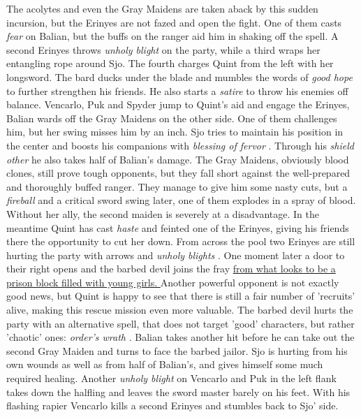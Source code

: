The acolytes and even the Gray Maidens are taken aback by this sudden incursion, but the Erinyes are not fazed and open the fight. One of them casts {\itshape fear} on Balian, but the buffs on the ranger aid him in shaking off the spell. A second Erinyes throws  {\itshape unholy blight} on the party, while a third wraps her entangling rope around Sjo. The fourth charges Quint from the left with her longsword. The bard ducks under the blade and mumbles the words of  {\itshape good hope} to further strengthen his friends. He also starts a  {\itshape satire} to throw his enemies off balance. Vencarlo, Puk and Spyder jump to Quint's aid and engage the Erinyes, Balian wards off the Gray Maidens on the other side. One of them challenges him, but her swing misses him by an inch. Sjo tries to maintain his position in the center and boosts his companions with  {\itshape blessing of fervor} . Through his  {\itshape shield other} he also takes half of Balian's damage. The Gray Maidens, obviously blood clones, still prove tough opponents, but they fall short against the well-prepared and thoroughly buffed ranger. They manage to give him some nasty cuts, but a  {\itshape fireball} and a critical sword swing later, one of them explodes in a spray of blood. Without her ally, the second maiden is severely at a disadvantage. In the meantime Quint has cast {\itshape haste} and feinted one of the Erinyes, giving his friends there the opportunity to cut her down. From across the pool two Erinyes are still hurting the party with arrows and  {\itshape unholy blights} . One moment later a door to their right opens and the barbed devil joins the fray \hyperref[fig:Gray-Maiden-recruits-of-sacrifices-616081293]{ from what looks to be a prison block filled with young girls. } Another powerful opponent is not exactly good news, but Quint is happy to see that there is still a fair number of 'recruits' alive, making this rescue mission even more valuable. The barbed devil hurts the party with an alternative spell, that does not target 'good' characters, but rather 'chaotic' ones:  {\itshape order's wrath} . Balian takes another hit before he can take out the second Gray Maiden and turns to face the barbed jailor. Sjo is hurting from his own wounds as well as from half of Balian's, and gives himself some much required healing. Another  {\itshape unholy blight} on Vencarlo and Puk in the left flank takes down the halfling and leaves the sword master barely on his feet. With his flashing rapier Vencarlo kills a second Erinyes and stumbles back to Sjo' side. \\

